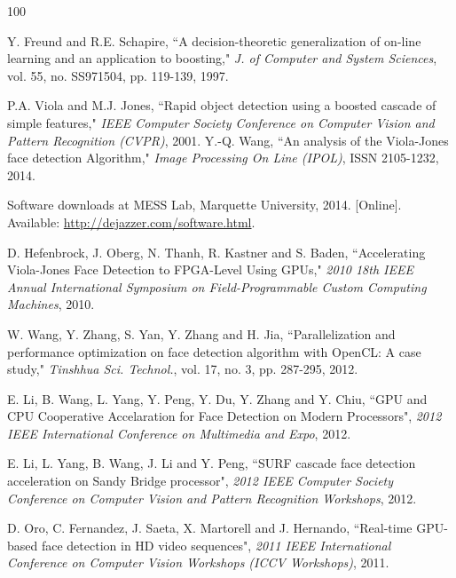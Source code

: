 \documentclass[conference]{IEEEtran}
\begin{document}


\begin {thebibliography}{100}


Y. Freund and R.E. Schapire, ``A decision-theoretic generalization of on-line learning and an application to boosting," \emph{J. of Computer and System Sciences}, vol. 55, no. SS971504, pp. 119-139, 1997.

P.A. Viola and M.J. Jones, ``Rapid object detection using a boosted cascade of simple features," \emph{IEEE Computer Society Conference on Computer Vision and Pattern Recognition (CVPR)}, 2001.
Y.-Q. Wang, ``An analysis of the Viola-Jones face detection Algorithm," \emph{Image Processing On Line (IPOL)}, ISSN 2105-1232, 2014.

Software downloads at MESS Lab, Marquette University, 2014. [Online]. Available: \url{http://dejazzer.com/software.html}.

D.  Hefenbrock, J.  Oberg, N.  Thanh, R.  Kastner and S.  Baden, ``Accelerating Viola-Jones Face Detection to FPGA-Level Using GPUs," \emph{2010 18th IEEE Annual International Symposium on Field-Programmable Custom Computing Machines}, 2010.

W. Wang, Y. Zhang, S. Yan, Y. Zhang and H. Jia, ``Parallelization and performance optimization on face detection algorithm with OpenCL: A case study," \emph{Tinshhua Sci. Technol.}, vol. 17, no. 3, pp. 287-295, 2012.

E.  Li, B.  Wang, L.  Yang, Y.  Peng, Y.  Du, Y.  Zhang and Y.  Chiu, ``GPU and CPU Cooperative Accelaration for Face Detection on Modern Processors", \emph{2012 IEEE International Conference on Multimedia and Expo}, 2012.

E. Li, L. Yang, B. Wang, J. Li and Y. Peng, ``SURF cascade face detection acceleration on Sandy Bridge processor", \emph{2012 IEEE Computer Society Conference on Computer Vision and Pattern Recognition Workshops}, 2012.

D. Oro, C. Fernandez, J. Saeta, X. Martorell and J. Hernando, ``Real-time GPU-based face detection in HD video sequences", \emph{2011 IEEE International Conference on Computer Vision Workshops (ICCV Workshops)}, 2011.


\end{thebibliography}
\end{document}
